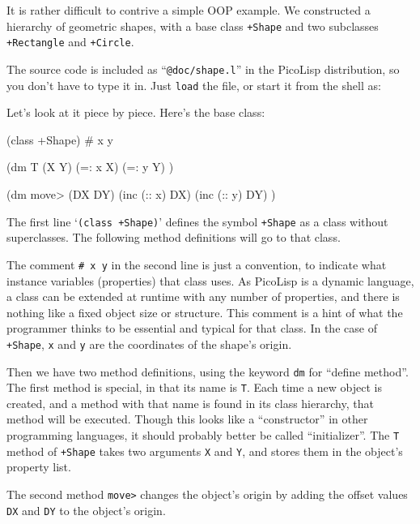 It is rather difficult to contrive a simple OOP example. We constructed
a hierarchy of geometric shapes, with a base class \texttt{+Shape} and two
subclasses \texttt{+Rectangle} and \texttt{+Circle}.

The source code is included as ``\texttt{@doc/shape.l}'' in the PicoLisp
distribution, so you don't have to type it in. Just \texttt{load} the file, or
start it from the shell as:



Let's look at it piece by piece. Here's the base class:


\begin{wideverbatim}
(class +Shape)
# x y

(dm T (X Y)
   (=: x X)
   (=: y Y) )

(dm move> (DX DY)
   (inc (:: x) DX)
   (inc (:: y) DY) )
\end{wideverbatim}

The first line `\texttt{(class +Shape)}' defines the symbol
\texttt{+Shape} as a class without superclasses. The following method
definitions will go to that class.

The comment  \texttt{\# x y}  in the second line is just a convention, to
indicate what instance variables (properties) that class uses. As
PicoLisp is a dynamic language, a class can be extended at runtime with
any number of properties, and there is nothing like a fixed object size
or structure. This comment is a hint of what the programmer thinks to be
essential and typical for that class. In the case of \texttt{+Shape}, \texttt{x} and
\texttt{y} are the coordinates of the shape's origin.

Then we have two method definitions, using the keyword \texttt{dm} for ``define
method''. The first method is special, in that its name is \texttt{T}. Each time
a new object is created, and a method with that name is found in its
class hierarchy, that method will be executed. Though this looks like a
``constructor'' in other programming languages, it should probably better
be called ``initializer''. The \texttt{T} method of \texttt{+Shape} takes two arguments
\texttt{X} and \texttt{Y}, and stores them in the object's property list.

The second method \texttt{move>} changes the object's origin by adding the
offset values \texttt{DX} and \texttt{DY} to the object's origin.

